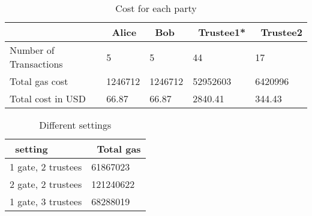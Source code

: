 \begin{table}[]
	\begin{tabular}{|l|l|l|l|l|}
		\hline
		& ~\textbf{Alice} &  ~\textbf{Bob} & ~\textbf{Trustee1*}  & ~\textbf{Trustee2}  \\ \hline
		Number of Transactions	& 5 &5  &44  &17  \\ \hline
		Total gas cost	& 1246712 &  1246712& 52952603  & 6420996 \\ \hline
		Total cost in USD	&  66.87& 66.87 &2840.41  & 344.43 \\ \hline
	\end{tabular}
	\caption{Cost for each party} 
\end{table}

\begin{table}[]
	\begin{tabular}{|l|l|}
	\hline
	~\textbf{setting}	& ~\textbf{Total gas}  \\ \hline
	1 gate, 2 trustees	& 61867023  \\ \hline
	2 gate, 2 trustees	&  121240622 \\ \hline
	1 gate, 3 trustees	& 68288019 \\ \hline
\end{tabular}
	\caption{Different settings}
\end{table}


